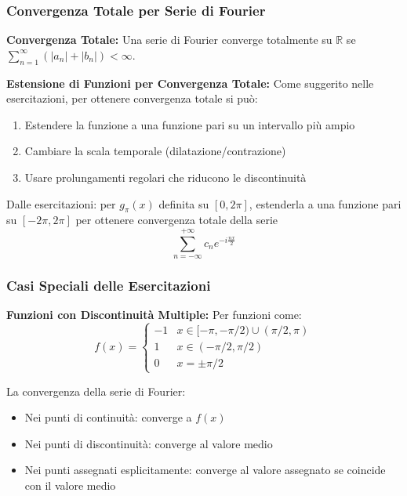 \subsubsection{Convergenza Totale per Serie di Fourier}

\begin{info}
\textbf{Convergenza Totale:}
Una serie di Fourier converge totalmente su $\mathbb{R}$ se $\sum_{n=1}^{\infty} (|a_n| + |b_n|) < \infty$.

\textbf{Estensione di Funzioni per Convergenza Totale:}
Come suggerito nelle esercitazioni, per ottenere convergenza totale si può:
\begin{enumerate}
    \item Estendere la funzione a una funzione pari su un intervallo più ampio
    \item Cambiare la scala temporale (dilatazione/contrazione)
    \item Usare prolungamenti regolari che riducono le discontinuità
\end{enumerate}
\end{info}

\begin{esempio}
Dalle esercitazioni: per $g_\pi(x)$ definita su $[0,2\pi]$, estenderla a una funzione pari su $[-2\pi,2\pi]$ per ottenere convergenza totale della serie
\[ \sum_{n=-\infty}^{+\infty} c_n e^{-i\frac{nx}{2}} \]
\end{esempio}

\subsubsection{Casi Speciali delle Esercitazioni}

\begin{info}
\textbf{Funzioni con Discontinuità Multiple:}
Per funzioni come:
\[ f(x) = \begin{cases} -1 & x \in [-\pi,-\pi/2) \cup (\pi/2,\pi) \\ 1 & x \in (-\pi/2,\pi/2) \\ 0 & x = \pm\pi/2 \end{cases} \]

La convergenza della serie di Fourier:
\begin{itemize}
    \item Nei punti di continuità: converge a $f(x)$
    \item Nei punti di discontinuità: converge al valore medio
    \item Nei punti assegnati esplicitamente: converge al valore assegnato se coincide con il valore medio
\end{itemize}
\end{info}

